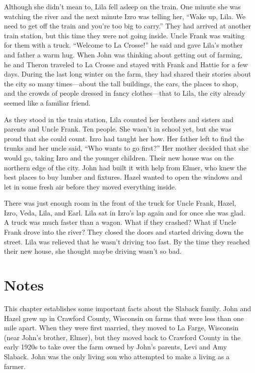 \documentclass[
  letterpaper,
]{book}
\begin{document}
Although she didn't mean to, Lila fell asleep on the train. One minute
she was watching the river and the next minute Izro was telling her,
``Wake up, Lila. We need to get off the train and you're too big to
carry.'' They had arrived at another train station, but this time they
were not going inside. Uncle Frank was waiting for them with a truck.
``Welcome to La Crosse!'' he said and gave Lila's mother and father a
warm hug. When John was thinking about getting out of farming, he and
Theron traveled to La Crosse and stayed with Frank and Hattie for a few
days. During the last long winter on the farm, they had shared their
stories about the city so many times---about the tall buildings, the
cars, the places to shop, and the crowds of people dressed in fancy
clothes---that to Lila, the city already seemed like a familiar friend.

As they stood in the train station, Lila counted her brothers and
sisters and parents and Uncle Frank. Ten people. She wasn't in school
yet, but she was proud that she could count. Izro had taught her how.
Her father left to find the trunks and her uncle said, ``Who wants to go
first?'' Her mother decided that she would go, taking Izro and the
younger children. Their new house was on the northern edge of the city.
John had built it with help from Elmer, who knew the best places to buy
lumber and fixtures. Hazel wanted to open the windows and let in some
fresh air before they moved everything inside.

There was just enough room in the front of the truck for Uncle Frank,
Hazel, Izro, Veda, Lila, and Earl. Lila sat in Izro's lap again and for
once she was glad. A truck was much faster than a wagon. What if they
crashed? What if Uncle Frank drove into the river? They closed the doors
and started driving down the street. Lila was relieved that he wasn't
driving too fast. By the time they reached their new house, she thought
maybe driving wasn't so bad.

\section{Notes}\label{notes-2}

This chapter establishes some important facts about the Slaback family.
John and Hazel grew up in Crawford County, Wisconsin on farms that were
less than one mile apart. When they were first married, they moved to La
Farge, Wisconsin (near John's brother, Elmer), but they moved back to
Crawford County in the early 1920s to take over the farm owned by John's
parents, Levi and Amy Slaback. John was the only living son who
attempted to make a living as a farmer.
\end{document}
